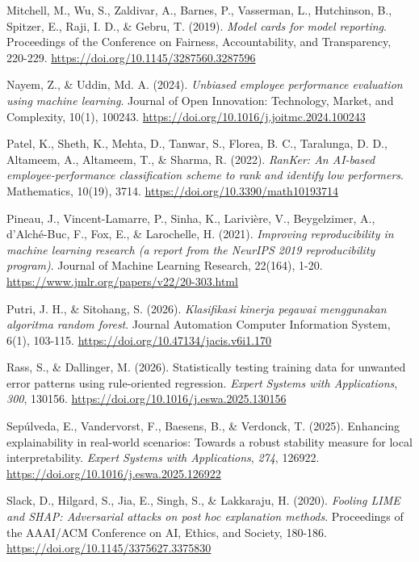 \documentclass[
  a4paper,
  review]{elsarticle}
\newlength{\cslhangindent}
\newenvironment{CSLReferences}[2] %
 {\begin{list}{}{%
  \setlength{\itemindent}{0pt}
  \setlength{\leftmargin}{0pt}
  \setlength{\parsep}{0pt}
  \ifodd #1
   \setlength{\leftmargin}{\cslhangindent}
   \setlength{\itemindent}{-1\cslhangindent}
  \fi
  \setlength{\itemsep}{#2\baselineskip}}}
 {\end{list}}
\begin{document}
\begin{CSLReferences}{1}{0}
Mitchell, M., Wu, S., Zaldivar, A., Barnes, P., Vasserman, L.,
Hutchinson, B., Spitzer, E., Raji, I. D., \& Gebru, T. (2019).
\emph{Model cards for model reporting}. Proceedings of the Conference on
Fairness, Accountability, and Transparency, 220-229.
\url{https://doi.org/10.1145/3287560.3287596}

Nayem, Z., \& Uddin, Md. A. (2024). \emph{Unbiased employee performance
evaluation using machine learning}. Journal of Open Innovation:
Technology, Market, and Complexity, 10(1), 100243.
\url{https://doi.org/10.1016/j.joitmc.2024.100243}

Patel, K., Sheth, K., Mehta, D., Tanwar, S., Florea, B. C., Taralunga,
D. D., Altameem, A., Altameem, T., \& Sharma, R. (2022). \emph{RanKer:
An AI-based employee-performance classification scheme to rank and
identify low performers}. Mathematics, 10(19), 3714.
\url{https://doi.org/10.3390/math10193714}

{Pineau, J., Vincent-Lamarre, P., Sinha, K., Larivière, V., Beygelzimer,
A., d'Alché-Buc, F., Fox, E., \& Larochelle, H.} (2021). \emph{Improving
reproducibility in machine learning research (a report from the NeurIPS
2019 reproducibility program)}. Journal of Machine Learning Research,
22(164), 1-20. \url{https://www.jmlr.org/papers/v22/20-303.html}

Putri, J. H., \& Sitohang, S. (2026). \emph{Klasifikasi kinerja pegawai
menggunakan algoritma random forest}. Journal Automation Computer
Information System, 6(1), 103-115.
\url{https://doi.org/10.47134/jacis.v6i1.170}

Rass, S., \& Dallinger, M. (2026). Statistically testing training data
for unwanted error patterns using rule-oriented regression. \emph{Expert
Systems with Applications}, \emph{300}, 130156.
\url{https://doi.org/10.1016/j.eswa.2025.130156}

Sepúlveda, E., Vandervorst, F., Baesens, B., \& Verdonck, T. (2025).
Enhancing explainability in real-world scenarios: Towards a robust
stability measure for local interpretability. \emph{Expert Systems with
Applications}, \emph{274}, 126922.
\url{https://doi.org/10.1016/j.eswa.2025.126922}

Slack, D., Hilgard, S., Jia, E., Singh, S., \& Lakkaraju, H. (2020).
\emph{Fooling LIME and SHAP: Adversarial attacks on post hoc explanation
methods}. Proceedings of the AAAI/ACM Conference on AI, Ethics, and
Society, 180-186. \url{https://doi.org/10.1145/3375627.3375830}


\end{CSLReferences}
\end{document}
